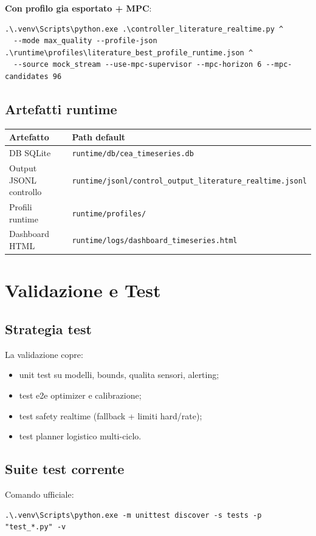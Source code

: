 ﻿\documentclass[11pt,a4paper]{report}
\begin{document}
\textbf{Con profilo gia esportato + MPC}:
\begin{lstlisting}
.\.venv\Scripts\python.exe .\controller_literature_realtime.py ^
  --mode max_quality --profile-json .\runtime\profiles\literature_best_profile_runtime.json ^
  --source mock_stream --use-mpc-supervisor --mpc-horizon 6 --mpc-candidates 96
\end{lstlisting}

\section{Artefatti runtime}
\begin{longtable}{@{}p{4.2cm}p{7.8cm}@{}}
\toprule
Artefatto & Path default \\ \midrule
DB SQLite & \texttt{runtime/db/cea\_timeseries.db} \\
Output JSONL controllo & \texttt{runtime/jsonl/control\_output\_literature\_realtime.jsonl} \\
Profili runtime & \texttt{runtime/profiles/} \\
Dashboard HTML & \texttt{runtime/logs/dashboard\_timeseries.html} \\
\bottomrule
\end{longtable}

\newpage
\chapter{Validazione e Test}

\section{Strategia test}
La validazione copre:
\begin{itemize}
  \item unit test su modelli, bounds, qualita sensori, alerting;
  \item test e2e optimizer e calibrazione;
  \item test safety realtime (fallback + limiti hard/rate);
  \item test planner logistico multi-ciclo.
\end{itemize}

\section{Suite test corrente}
Comando ufficiale:
\begin{lstlisting}
.\.venv\Scripts\python.exe -m unittest discover -s tests -p "test_*.py" -v
\end{lstlisting}
\end{document}
